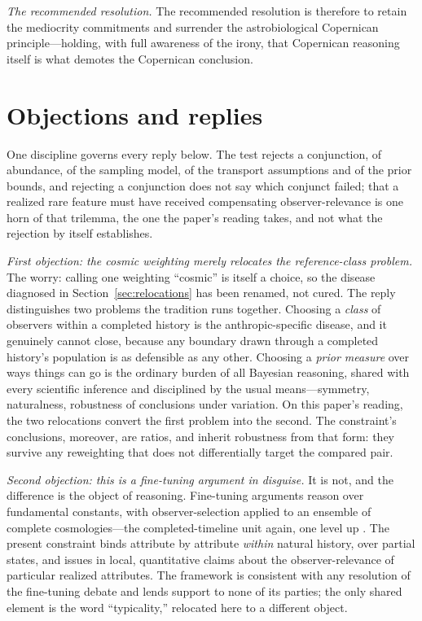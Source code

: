 \textit{The recommended resolution.} The recommended resolution is therefore to retain the mediocrity commitments and surrender the astrobiological Copernican principle---holding, with full awareness of the irony, that Copernican reasoning itself is what demotes the Copernican conclusion.

\section{Objections and replies}
\label{sec:objections}

One discipline governs every reply below. The test rejects a conjunction, of abundance, of the sampling model, of the transport assumptions and of the prior bounds, and rejecting a conjunction does not say which conjunct failed; that a realized rare feature must have received compensating observer-relevance is one horn of that trilemma, the one the paper's reading takes, and not what the rejection by itself establishes.

\emph{First objection: the cosmic weighting merely relocates the reference-class problem.} The worry: calling one weighting ``cosmic'' is itself a choice, so the disease diagnosed in Section~\ref{sec:relocations} has been renamed, not cured. The reply distinguishes two problems the tradition runs together. Choosing a \emph{class} of observers within a completed history is the anthropic-specific disease, and it genuinely cannot close, because any boundary drawn through a completed history's population is as defensible as any other. Choosing a \emph{prior measure} over ways things can go is the ordinary burden of all Bayesian reasoning, shared with every scientific inference and disciplined by the usual means---symmetry, naturalness, robustness of conclusions under variation. On this paper's reading, the two relocations convert the first problem into the second. The constraint's conclusions, moreover, are ratios, and inherit robustness from that form: they survive any reweighting that does not differentially target the compared pair.

\emph{Second objection: this is a fine-tuning argument in disguise.} It is not, and the difference is the object of reasoning. Fine-tuning arguments reason over fundamental constants, with observer-selection applied to an ensemble of complete cosmologies---the completed-timeline unit again, one level up \cite{bostrom2002anthropic}. The present constraint binds attribute by attribute \emph{within} natural history, over partial states, and issues in local, quantitative claims about the observer-relevance of particular realized attributes. The framework is consistent with any resolution of the fine-tuning debate and lends support to none of its parties; the only shared element is the word ``typicality,'' relocated here to a different object.

